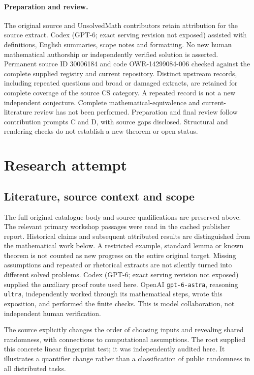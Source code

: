 \documentclass[11pt]{article}
\begin{document}
\paragraph{Preparation and review.}
The original source and UnsolvedMath contributors retain attribution for the source extract. Codex (GPT-6; exact serving revision not exposed) assisted with definitions, English summaries, scope notes and formatting. No new human mathematical authorship or independently verified solution is asserted. Permanent source ID 30006184 and code OWR-14299084-006 checked against the complete supplied registry and current repository. Distinct upstream records, including repeated questions and broad or damaged extracts, are retained for complete coverage of the source CS category. A repeated record is not a new independent conjecture. Complete mathematical-equivalence and current-literature review has not been performed. Preparation and final review follow contribution prompts C and D, with source gaps disclosed. Structural and rendering checks do not establish a new theorem or open status.
\label{end:30006184}

\section{Research attempt}
\subsection{Literature, source context and scope}
The full original catalogue body and source qualifications are preserved above. The relevant primary workshop passages were read in the cached publisher report. Historical claims and subsequent attributed results are distinguished from the mathematical work below. A restricted example, standard lemma or known theorem is not counted as new progress on the entire original target. Missing assumptions and repeated or rhetorical extracts are not silently turned into different solved problems.
Codex (GPT-6; exact serving revision not exposed) supplied the auxiliary proof route used here. OpenAI \texttt{gpt-6-astra}, reasoning \texttt{ultra}, independently worked through its mathematical steps, wrote this exposition, and performed the finite checks. This is model collaboration, not independent human verification.

The source explicitly changes the order of choosing inputs and revealing shared randomness, with connections to computational assumptions. The root supplied this concrete linear fingerprint test; it was independently audited here. It illustrates a quantifier change rather than a classification of public randomness in all distributed tasks.
\end{document}
